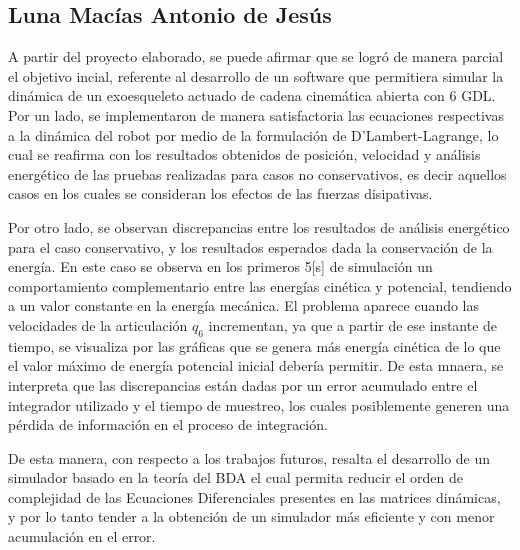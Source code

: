 
\subsection{Luna Macías Antonio de Jesús}
    \noindent A partir del proyecto elaborado, se puede afirmar que se logró 
    de manera parcial el objetivo incial, referente al desarrollo 
    de un software que permitiera simular la dinámica de un exoesqueleto 
    actuado de cadena cinemática abierta con 6 GDL. Por un lado, 
    se implementaron de manera satisfactoria las ecuaciones respectivas a 
    la dinámica del robot por medio de la formulación de 
    D'Lambert-Lagrange, lo cual se reafirma con los resultados 
    obtenidos de posición, velocidad y análisis energético de las 
    pruebas realizadas para casos no conservativos, es decir 
    aquellos casos en los cuales se consideran los efectos de las fuerzas 
    disipativas. 

    Por otro lado, se observan discrepancias entre los resultados de análisis 
    energético para el caso conservativo, y los resultados esperados dada la conservación de 
    la energía. En este caso se observa en los primeros 5[s] de simulación un comportamiento 
    complementario entre las energías cinética y potencial, tendiendo a un valor 
    constante en la energía mecánica. El problema aparece cuando las velocidades 
    de la articulación $q_6$ incrementan, ya que a partir de ese instante de tiempo, se 
    visualiza por las gráficas que se genera más energía cinética de lo que el valor 
    máximo de energía potencial inicial debería permitir. De esta mnaera, se interpreta 
    que las discrepancias están dadas por un error acumulado entre el integrador 
    utilizado y el tiempo de muestreo, los cuales posiblemente generen una pérdida de información 
    en el proceso de integración.

    De esta manera, con respecto a los trabajos futuros, resalta el desarrollo de un 
    simulador basado en la teoría del BDA el cual permita reducir el orden de 
    complejidad de las Ecuaciones Diferenciales presentes en las matrices dinámicas, 
    y por lo tanto tender a la obtención de un simulador más eficiente y con 
    menor acumulación en el error.
